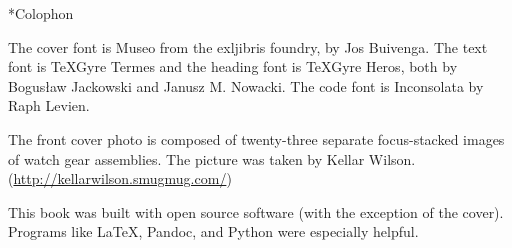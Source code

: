 \begin{chapter}*{Colophon}

\noindent The cover font is Museo from the exljibris foundry, by Jos 
Buivenga.  The text font is \TeX Gyre Termes and the heading font is \TeX Gyre
Heros, both by Bogus\l{}aw Jackowski and Janusz M. Nowacki.  The code font is
Inconsolata by Raph Levien.

The front cover photo is composed of twenty-three separate focus-stacked images
of watch gear assemblies. The picture was taken by Kellar Wilson.
(\url{http://kellarwilson.smugmug.com/})

This book was built with open source software (with the exception of the
cover).  Programs like \LaTeX, Pandoc, and Python were especially helpful.

\end{chapter}

\pagebreak
\thispagestyle{empty}
\mbox{}


